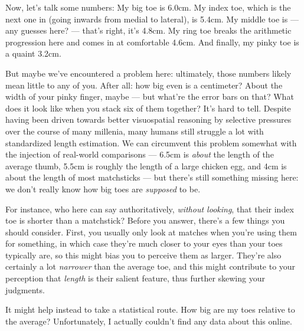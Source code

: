 \documentclass{fkpset}
\begin{document}
\begin{solution}[Outline.]
  Now, let's talk some numbers: My big toe is 6.0\si{cm}. My index toe, which is
  the next one in (going inwards from medial to lateral), is 5.4\si{cm}. My
  middle toe is --- any guesses here? --- that's right, it's 4.8\si{cm}. My ring
  toe breaks the arithmetic progression here and comes in at comfortable
  4.6\si{cm}. And finally, my pinky toe is a quaint 3.2\si{cm}.

  But maybe we've encountered a problem here: ultimately, those numbers likely
  mean little to any of you. After all: how big even is a centimeter? About the
  width of your pinky finger, maybe --- but what're the error bars on that? What
  does it look like when you stack six of them together? It's hard to tell.
  Despite having been driven towards better visuospatial reasoning by selective
  pressures over the course of many millenia, many humans still struggle a lot
  with standardized length estimation. We can circumvent this problem somewhat
  with the injection of real-world comparisons --- 6.5\si{cm} is \emph{about}
  the length of the average thumb, 5.5\si{cm} is roughly the length of a
  large chicken egg, and 4\si{cm} is about the length of most matchsticks ---
  but there's still something missing here: we don't really know how big toes
  are \emph{supposed} to be.

  For instance, who here can say authoritatively, \emph{without looking}, that
  their index toe is shorter than a matchstick? Before you answer, there's a few
  things you should consider. First, you usually only look at matches when
  you're using them for something, in which case they're much closer to your
  eyes than your toes typically are, so this might bias you to perceive them as
  larger. They're also certainly a lot \emph{narrower} than the average toe, and
  this might contribute to your perception that \emph{length} is their salient
  feature, thus further skewing your judgments.

  It might help instead to take a statistical route. How big are my toes
  relative to the average? Unfortunately, I actually couldn't find any data
  about this online.





\end{solution}
\end{document}

